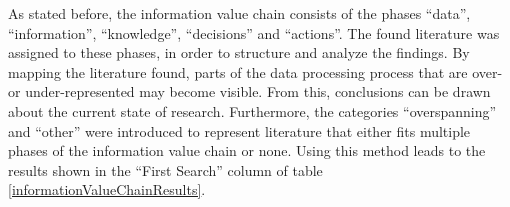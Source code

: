 







As stated before, the information value chain consists of the phases \enquote{data}, \enquote{information}, \enquote{knowledge}, \enquote{decisions} and \enquote{actions}. The found literature was assigned to these phases, in order to structure and analyze the findings. %
By mapping the literature found, parts of the data processing process that are over- or under-represented may become visible. From this, conclusions can be drawn about the current state of research. Furthermore, the categories \enquote{overspanning} and \enquote{other} were introduced to represent literature that either fits multiple phases of the information value chain or none. Using this method leads to the results shown in the \enquote{First Search} column of table \ref{informationValueChainResults}.

